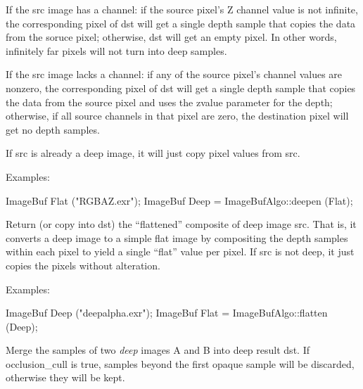 If the {\cf src} image has a  channel: if the source pixel's {\cf Z}
channel value is not infinite, the corresponding pixel of {\cf dst} will get
a single depth sample that copies the data from the soruce pixel; otherwise,
{\cf dst} will get an empty pixel. In other words, infinitely far pixels
will not turn into deep samples.

If the {\cf src} image lacks a  channel: if any of the source pixel's
channel values are nonzero, the corresponding pixel of {\cf dst} will get a
single depth sample that copies the data from the source pixel and uses the
{\cf zvalue} parameter for the depth; otherwise, if all source channels in
that pixel are zero, the destination pixel will get no depth samples.

If {\cf src} is already a deep image, it will just copy pixel values from
{\cf src}.

\smallskip
\noindent Examples:
\begin{code}
    ImageBuf Flat ("RGBAZ.exr");
    ImageBuf Deep = ImageBufAlgo::deepen (Flat);
\end{code}
\apiend

  
Return (or copy into {\cf dst}) the ``flattened'' composite of deep image
{\cf src}. That is, it converts a deep image to a simple flat image by
compositing the depth samples within each pixel to yield a single ``flat''
value per pixel. If {\cf src} is not deep, it just copies the pixels without
alteration.

\smallskip
\noindent Examples:
\begin{code}
    ImageBuf Deep ("deepalpha.exr");
    ImageBuf Flat = ImageBufAlgo::flatten (Deep);
\end{code}
\apiend

  
Merge the samples of two \emph{deep} images {\cf A} and {\cf B} into deep
result {\cf dst}. If {\cf occlusion_cull} is {\cf true}, samples beyond
the first opaque sample will be discarded, otherwise they will be kept.

